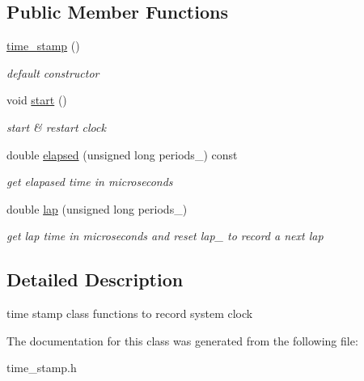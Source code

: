 \subsection*{Public Member Functions}
\begin{DoxyCompactItemize}
\item 
\hypertarget{classtime__stamp_a185f988aa816070964bd336297f6d1c4}{
\hyperlink{classtime__stamp_a185f988aa816070964bd336297f6d1c4}{time\_\-stamp} ()}
\label{classtime__stamp_a185f988aa816070964bd336297f6d1c4}

\begin{DoxyCompactList}\small\item\em default constructor \item\end{DoxyCompactList}\item 
\hypertarget{classtime__stamp_aaaea515d75416e2d39d58e619767e753}{
void \hyperlink{classtime__stamp_aaaea515d75416e2d39d58e619767e753}{start} ()}
\label{classtime__stamp_aaaea515d75416e2d39d58e619767e753}

\begin{DoxyCompactList}\small\item\em start \& restart clock \item\end{DoxyCompactList}\item 
\hypertarget{classtime__stamp_a17aa50a50ba1fffea10ffbca77955176}{
double \hyperlink{classtime__stamp_a17aa50a50ba1fffea10ffbca77955176}{elapsed} (unsigned long periods\_) const }
\label{classtime__stamp_a17aa50a50ba1fffea10ffbca77955176}

\begin{DoxyCompactList}\small\item\em get elapased time in microseconds \item\end{DoxyCompactList}\item 
\hypertarget{classtime__stamp_a83a3b4f60121d8bc4e4853be0911be66}{
double \hyperlink{classtime__stamp_a83a3b4f60121d8bc4e4853be0911be66}{lap} (unsigned long periods\_)}
\label{classtime__stamp_a83a3b4f60121d8bc4e4853be0911be66}

\begin{DoxyCompactList}\small\item\em get lap time in microseconds and reset lap\_\- to record a next lap \item\end{DoxyCompactList}\end{DoxyCompactItemize}


\subsection{Detailed Description}
time stamp class functions to record system clock 

The documentation for this class was generated from the following file:\begin{DoxyCompactItemize}
\item 
time\_\-stamp.h\end{DoxyCompactItemize}
